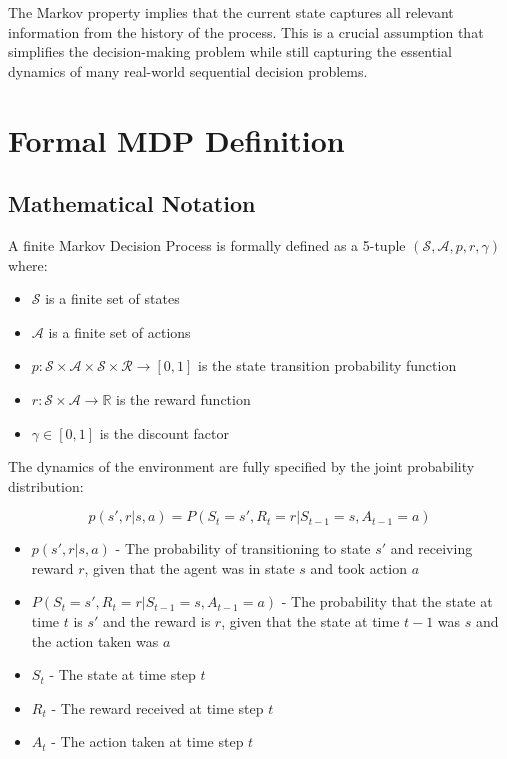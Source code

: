 \documentclass[12pt,a4paper]{article}
\begin{document}
The Markov property implies that the current state captures all relevant information from the history of the process. This is a crucial assumption that simplifies the decision-making problem while still capturing the essential dynamics of many real-world sequential decision problems.

\section{Formal MDP Definition}

\subsection{Mathematical Notation}

A finite Markov Decision Process is formally defined as a 5-tuple $(\mathcal{S}, \mathcal{A}, p, r, \gamma)$ where:

\begin{itemize}
    \item $\mathcal{S}$ is a finite set of states
    \item $\mathcal{A}$ is a finite set of actions
    \item $p: \mathcal{S} \times \mathcal{A} \times \mathcal{S} \times \mathcal{R} \rightarrow [0, 1]$ is the state transition probability function
    \item $r: \mathcal{S} \times \mathcal{A} \rightarrow \mathbb{R}$ is the reward function
    \item $\gamma \in [0, 1]$ is the discount factor
\end{itemize}

The dynamics of the environment are fully specified by the joint probability distribution:

\begin{equation}
p(s',r|s,a) = P(S_t = s', R_t = r|S_{t-1} = s, A_{t-1} = a)
\end{equation}

\begin{tcolorbox}[title=Notation Overview]
\begin{itemize}
    \item $p(s',r|s,a)$ - The probability of transitioning to state $s'$ and receiving reward $r$, given that the agent was in state $s$ and took action $a$
    \item $P(S_t = s', R_t = r|S_{t-1} = s, A_{t-1} = a)$ - The probability that the state at time $t$ is $s'$ and the reward is $r$, given that the state at time $t-1$ was $s$ and the action taken was $a$
    \item $S_t$ - The state at time step $t$
    \item $R_t$ - The reward received at time step $t$
    \item $A_t$ - The action taken at time step $t$
\end{itemize}
\end{tcolorbox}
\end{document}

